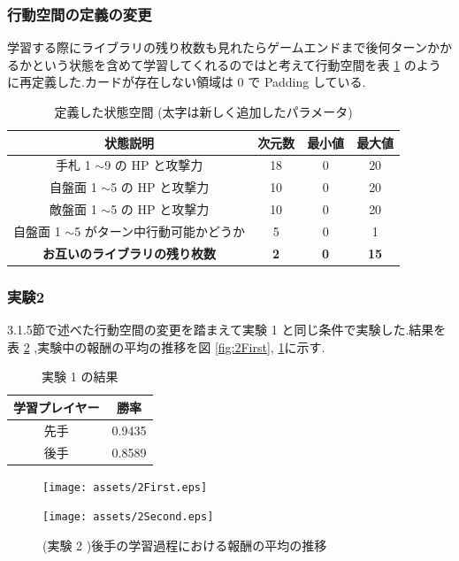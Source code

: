 \documentclass{jarticle}     %
\begin{document}
\subsubsection{行動空間の定義の変更}
学習する際にライブラリの残り枚数も見れたらゲームエンドまで後何ターンかかるかという状態を含めて学習してくれるのではと考えて行動空間を表 \ref{table:state} のように再定義した.カードが存在しない領域は 0 で Padding している.

\begin{table}[H]
  \centering
  \caption{定義した状態空間 (太字は新しく追加したパラメータ)}
  \label{table:state}
  \begin{tabular}{|c|c|c|c|}
  \hline
  状態説明                        & 次元数        & 最小値        & 最大値         \\ \hline
  手札 1 $\sim$9 の HP と攻撃力      & 18         & 0          & 20          \\ \hline
  自盤面 1 $\sim$5 の HP と攻撃力     & 10         & 0          & 20          \\ \hline
  敵盤面 1 $\sim$5 の HP と攻撃力     & 10         & 0          & 20          \\ \hline
  自盤面 1 $\sim$5 がターン中行動可能かどうか & 5          & 0          & 1           \\ \hline
  \textbf{お互いのライブラリの残り枚数}     & \textbf{2} & \textbf{0} & \textbf{15} \\ \hline
  \end{tabular}
  \end{table}


\subsubsection{実験2}
3.1.5節で述べた行動空間の変更を踏まえて実験 1 と同じ条件で実験した.結果を表 \ref{table:jikken2} ,実験中の報酬の平均の推移を図 \ref{fig:2First}, \ref{fig:2Second}に示す.

\begin{table}[H]
  \centering
  \caption{実験 1 の結果}
  \label{table:jikken2}
  \begin{tabular}{|c|c|}
  \hline
  学習プレイヤー & 勝率     \\ \hline
  先手      & 0.9435 \\ \hline
  後手      & 0.8589 \\ \hline
  \end{tabular}
  \end{table}

  \begin{figure}[htbp]
    \begin{minipage}[b]{0.52\linewidth}
      \centering
      \texttt{[image: assets/2First.eps]}
      \caption{(実験 2 )先手の学習過程における報酬の平均の推移}
      \label{fig:2First}
    \end{minipage}
    \begin{minipage}[b]{0.52\linewidth}
      \centering
      \texttt{[image: assets/2Second.eps]}
      \caption{(実験 2 )後手の学習過程における報酬の平均の推移}
      \label{fig:2Second}
    \end{minipage}
  \end{figure}
\end{document}
